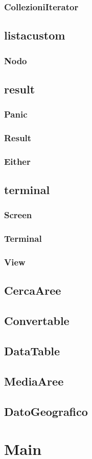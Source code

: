 \documentclass[a4paper, 12pt]{report}
\begin{document}
				\subsubsection{CollezioniIterator}
			\subsection{listacustom}
				\subsubsection{Nodo}
			\subsection{result}
				\subsubsection{Panic}
				\subsubsection{Result}
				\subsubsection{Either}

			\subsection{terminal}
				\subsubsection{Screen}
				\subsubsection{Terminal}
				\subsubsection{View}

			\subsection{CercaAree}
			\subsection{Convertable}
			\subsection{DataTable}
			\subsection{MediaAree}
			\subsection{DatoGeografico}

		\section{Main}

	
\end{document}

